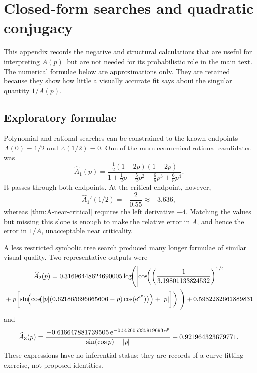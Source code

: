 \section{Closed-form searches and quadratic conjugacy}
\label{app:closed-form-search}

This appendix records the negative and structural calculations that are useful for
interpreting \(A(p)\), but are not needed for its probabilistic role in the main
text.  The numerical formulae below are approximations only.  They are retained
because they show how little a visually accurate fit says about the singular
quantity \(1/A(p)\).

\subsection{Exploratory formulae}

Polynomial and rational searches can be constrained to the known endpoints
\(A(0)=1/2\) and \(A(1/2)=0\).  One of the more economical rational candidates was
\begin{equation}
  \widehat A_1(p)
  =
  \frac{\tfrac12(1-2p)(1+2p)}
       {1+\tfrac12p-\tfrac52p^2-\tfrac65p^3+\tfrac65p^4}.
  \label{eq:Ahat1}
\end{equation}
It passes through both endpoints.  At the critical endpoint, however,
\begin{equation}
  \widehat A_1'(1/2)=-\frac{2}{0.55}\approx-3.636,
\end{equation}
whereas \cref{thm:A-near-critical} requires the left derivative \(-4\).
Matching the values but missing this slope is enough to make the relative error in
\(A\), and hence the error in \(1/A\), unacceptable near criticality.

A less restricted symbolic tree search produced many longer formulae of similar
visual quality.  Two representative outputs were
\begin{multline}
  \widehat A_2(p)
  =0.31696448624690005
  \log\!\Biggl(
  \Biggl|\cos\!\biggl(
  \left(\frac{1}{3.19801133824532}\right)^{1/4}\\
  {}+p\biggl[
  \sin\!\Bigl(
    \cos\!\bigl(|p|(0.621865696665606-p)
    \cos(\mathrm{e}^{\mathrm{e}^p})\bigr)
  \Bigr)+|p|
  \biggr]\biggr)\Biggr|
  \Biggr)
  +0.5982282661889831
  \label{eq:Ahat2}
\end{multline}
and
\begin{equation}
  \widehat A_3(p)
  =
  \frac{-0.616647881739505\,
  \mathrm{e}^{-0.552605335919693\,\mathrm{e}^p}}
  {\sin(\cos p)-|p|}
  +0.921964323679771.
  \label{eq:Ahat3}
\end{equation}
These expressions have no inferential status: they are records of a curve-fitting
exercise, not proposed identities.

